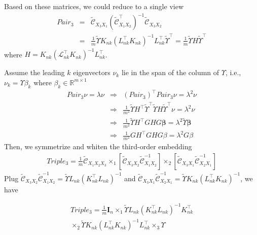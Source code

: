 \documentclass{article}
\begin{document}
Based on these matrices, we could reduce to a single view
%
\begin{eqnarray*}
Pair_3 &=&
\widetilde{\mathcal{C}}_{X_3X_1}(\widetilde{\mathcal{C}}_{X_1X_2}^\top)^{-1}\widetilde{\mathcal{C}}_{X_3X_2}\\
&=&\frac{1}{m}\widetilde\Upsilon{K}_{nk}({L}_{nk}^\top{K}_{nk})^{-1}{L}_{nk}^\top\widetilde\Upsilon^\top = \frac{1}{m}\widetilde\Upsilon{H}\widetilde\Upsilon^\top
\end{eqnarray*}
where ${H} = {K}_{nk}(\mathcal{L}_{nk}^\top{K}_{nk})^{-1}{L}_{nk}^\top$.

Assume the leading $k$ eigenvectors $\nu_k$ lie in the span of the column of $\Upsilon$, i.e., $\nu_k = \Upsilon \beta_k$ where $\beta_k\in \mathbb{R}^{m\times 1}$
%
\begin{eqnarray*}
Pair_3\nu = \lambda \nu &\Rightarrow& (Pair_3)^\top Pair_3\nu = \lambda^2 \nu \\
&\Rightarrow&
\frac{1}{m^2} \widetilde\Upsilon{H}^\top\widetilde\Upsilon^\top\widetilde\Upsilon{H}\widetilde\Upsilon^\top\nu
= \lambda^2\nu \\
&\Rightarrow&
\frac{1}{m^2}\widetilde\Upsilon{H^\top GHG}\bm{\beta} =
\lambda^2 \widetilde\Upsilon\bm{\beta} \\
&\Rightarrow& \frac{1}{m^2}{GH^\top GHG}\beta
= \lambda^2{G}\beta
\end{eqnarray*}
%
Then, we symmetrize and whiten the third-order embedding
%
\begin{eqnarray}
Triple_3 = \frac{1}{m}\widetilde{\mathcal{C}}_{X_1X_2X_3} \times_1
[\widetilde{\mathcal{C}}_{X_3X_2}\widetilde{\mathcal{C}}_{X_1X_2}^{-1}]
\times_2
[\widetilde{\mathcal{C}}_{X_3X_1}\widetilde{\mathcal{C}}_{X_2X_1}^{-1}]
\end{eqnarray}
%
Plug
$\widetilde{\mathcal{C}}_{X_3X_2}\widetilde{\mathcal{C}}_{X_1X_2}^{-1} =
\widetilde\Upsilon{L}_{nk}({K}_{nk}^\top{L}_{nk})^{-1}$
and
$\widetilde{\mathcal{C}}_{X_3X_1}\widetilde{\mathcal{C}}_{X_2X_1}^{-1} =
\widetilde\Upsilon{K}_{nk}({L}_{nk}^\top{K}_{nk})^{-1}$,
we have

\begin{eqnarray*}
Triple_3  = \frac{1}{m}\bm{I}_n \times_1
\widetilde\Upsilon{L}_{nk}({K}_{nk}^\top
{L}_{nk})^{-1}{K}_{nk}^\top\\ \times_2
\widetilde\Upsilon{K}_{nk}({L}_{nk}^\top
{K}_{nk})^{-1}{L}_{nk}^\top \times_3 \Upsilon
\end{eqnarray*}
\end{document}

